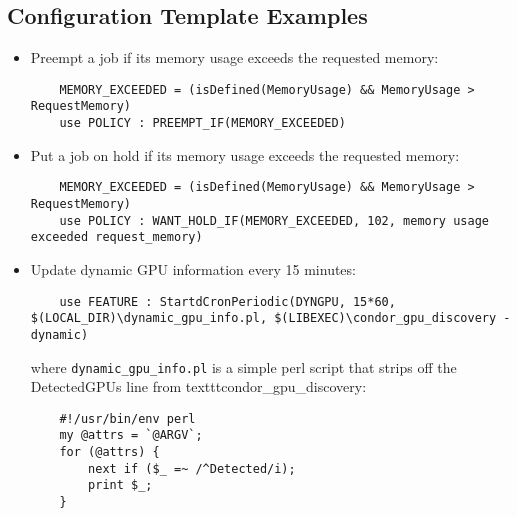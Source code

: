 \subsection{\label{sec:Config-Template-Examples}Configuration Template
Examples}

\begin{itemize}
\item Preempt a job if its memory usage exceeds the requested memory:
    \begin{verbatim}
	MEMORY_EXCEEDED = (isDefined(MemoryUsage) && MemoryUsage > RequestMemory)
	use POLICY : PREEMPT_IF(MEMORY_EXCEEDED)
    \end{verbatim}

\item Put a job on hold if its memory usage exceeds the requested memory:
    \begin{verbatim}
	MEMORY_EXCEEDED = (isDefined(MemoryUsage) && MemoryUsage > RequestMemory)
	use POLICY : WANT_HOLD_IF(MEMORY_EXCEEDED, 102, memory usage exceeded request_memory)
    \end{verbatim}

\item Update dynamic GPU information every 15 minutes:

    \begin{verbatim}
	use FEATURE : StartdCronPeriodic(DYNGPU, 15*60, $(LOCAL_DIR)\dynamic_gpu_info.pl, $(LIBEXEC)\condor_gpu_discovery -dynamic)
    \end{verbatim}

where \texttt{dynamic\_gpu\_info.pl}  is a simple perl script that strips
off the DetectedGPUs line from texttt{condor\_gpu\_discovery}:

    \begin{verbatim}
	#!/usr/bin/env perl
	my @attrs = `@ARGV`;
	for (@attrs) {
		next if ($_ =~ /^Detected/i);
		print $_;
	}
    \end{verbatim}
\end{itemize}
